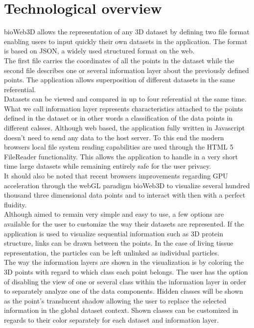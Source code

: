 \documentclass{bioinfo}
\begin{document}
\section{Technological overview}

bioWeb3D allows the representation of any 3D dataset by defining two file format enabling users to input quickly their own datasets in the application. The format is based on JSON, a widely used structured format on the web. \\
The first file carries the coordinates of all the points in the dataset while the second file describes one or several information layer about the previously defined points. The application allows superposition of different datasets in the same referential.\\
Datasets can be viewed and compared in up to four referential at the same time. What we call information layer represents characteristics attached to the points defined in the dataset or in other words a classification of the data points in different calsses.  Although web based, the application fully written in Javascript doesn’t need to send any data to the host server. To this end the modern browsers local file system reading capabilities are used through the HTML 5 FileReader functionality. This allows the application to handle in a very short time large datasets while remaining entirely safe for the user privacy. \\
It should also be noted that recent browsers improvements regarding GPU acceleration through the webGL paradigm bioWeb3D to visualize several hundred thousand three dimensional data points and to interact with then with a perfect fluidity.\\
Although aimed to remain very simple and easy to use, a few options are available for the user to customize the way their datasets are represented. If the application is used to visualize sequential information such as 3D protein structure, links can be drawn between the points. In the case of living tissue representation, the particles can be left unlinked as individual particles. \\
The way the information layers are shown in the visualization is by coloring the 3D points with regard to which class each point belongs. The user has the option of disabling the view of one or several class within the information layer in order to separately analyze one of the data components. Hidden classes will be shown as the point’s translucent shadow allowing the user to replace the selected information in the global dataset context. Shown classes can be customized in regards to their color separately for each dataset and information layer.\\
\end{document}
